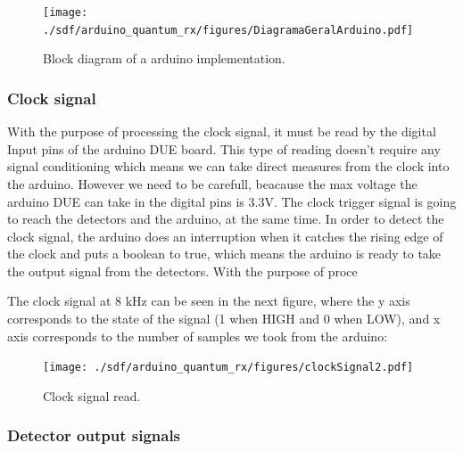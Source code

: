 \begin{refsection}
	\begin{figure}[H]
		\centering
		\texttt{[image: ./sdf/arduino\_quantum\_rx/figures/DiagramaGeralArduino.pdf]}
		\caption{Block diagram of a arduino implementation.}
		\label{fig:netxpto}	
	\end{figure}
	
	\vspace{15px}
	\subsubsection{Clock signal}
	
	With the purpose of processing the clock signal, it must be read by the digital Input pins of the arduino DUE board. This type of reading doesn't require any signal conditioning which means we can take direct measures from the clock into the arduino. However we need to be carefull, beacause the max voltage the arduino DUE can take in the digital pins is 3.3V. The clock trigger signal is going to reach the detectors and the arduino, at the same time. In order to detect the clock signal, the arduino does an interruption when it catches the rising edge of the clock and puts a boolean to true, which means the arduino is ready to take the output signal from the detectors.  With the purpose of proce
	
   \clearpage 
   The clock signal at 8 kHz can be seen in the next figure, where the y axis corresponds to the state of the signal (1 when HIGH and 0 when LOW), and x axis corresponds to the number of samples we took from the arduino:
   
   
	
	\begin{figure}[H]
		\centering
		\texttt{[image: ./sdf/arduino\_quantum\_rx/figures/clockSignal2.pdf]}
		\caption{Clock signal read.}
		\label{montage}
	\end{figure}

\subsubsection{Detector output signals}


\end{refsection}
